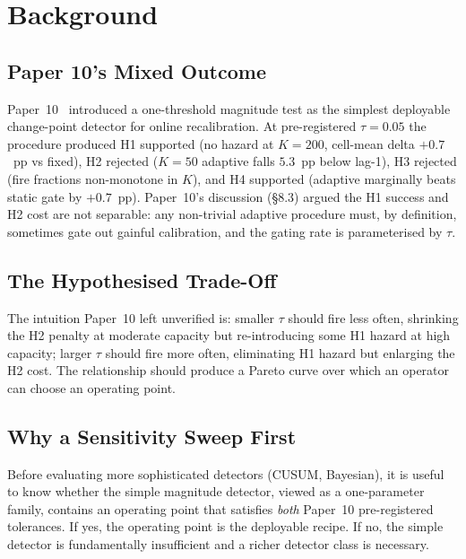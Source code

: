 \section{Background}

\subsection{Paper 10's Mixed Outcome}

Paper~10~\cite{paper10adaptive} introduced a one-threshold magnitude
test as the simplest deployable change-point detector for online
recalibration. At pre-registered $\tau = 0.05$ the procedure produced
H1 supported (no hazard at $K = 200$, cell-mean delta $+0.7$~pp
vs fixed), H2 rejected ($K = 50$ adaptive falls $5.3$~pp below
lag-1), H3 rejected (fire fractions non-monotone in $K$), and H4
supported (adaptive marginally beats static gate by $+0.7$~pp).
Paper~10's discussion (\S8.3) argued the H1 success and H2 cost are
not separable: any non-trivial adaptive procedure must, by definition,
sometimes gate out gainful calibration, and the gating rate is
parameterised by $\tau$.

\subsection{The Hypothesised Trade-Off}

The intuition Paper~10 left unverified is: smaller $\tau$ should
fire less often, shrinking the H2 penalty at moderate capacity but
re-introducing some H1 hazard at high capacity; larger $\tau$ should
fire more often, eliminating H1 hazard but enlarging the H2 cost.
The relationship should produce a Pareto curve over which an operator
can choose an operating point.

\subsection{Why a Sensitivity Sweep First}

Before evaluating more sophisticated detectors (CUSUM, Bayesian),
it is useful to know whether the simple magnitude detector, viewed
as a one-parameter family, contains an operating point that
satisfies \textit{both} Paper~10 pre-registered tolerances. If yes,
the operating point is the deployable recipe. If no, the simple
detector is fundamentally insufficient and a richer detector class
is necessary.
